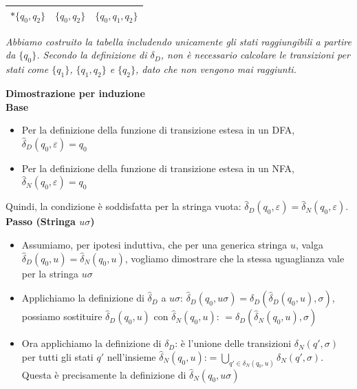 \documentclass[12pt, a4paper]{report}
\begin{document}
\begin{example}{}
\begin{itemize}
\begin{itemize}
\begin{center}
\begin{tabular}{|c|c|c|}
                                $*\{q_0,q_2\}$ & $\{q_0,q_2\}$ & $\{q_0,q_1,q_2\}$\\
                                \hline
                            \end{tabular}
                            \end{center}
                        \end{itemize}
                    \end{itemize}
                    \textit{Abbiamo costruito la tabella includendo unicamente gli stati raggiungibili a partire da $\{q_0\}$. Secondo la definizione di $\delta_D$, non è necessario calcolare le transizioni per stati come $\{q_1\}$, $\{q_1,q_2\}$ e $\{q_2\}$, dato che non vengono mai raggiunti.}
                \end{example}
                \begin{demonstration}
                    \large\textbf{Dimostrazione per induzione}\normalsize\\
                    \textbf{Base}
                    \begin{itemize}
                        \item Per la definizione della funzione di transizione estesa in un DFA, $\hat{\delta}_D({q_0}, \varepsilon) = {q_0}$
                        \item Per la definizione della funzione di transizione estesa in un NFA, $\hat{\delta}_N(q_0, \varepsilon) = {q_0}$
                    \end{itemize}
                    Quindi, la condizione è soddisfatta per la stringa vuota: $\hat{\delta}_D({q_0}, \varepsilon) = \hat{\delta}_N(q_0, \varepsilon)$.\\
                    \textbf{Passo (Stringa $u\sigma$)}
                    \begin{itemize}
                        \item Assumiamo, per ipotesi induttiva, che per una generica stringa $u$, valga $\hat{\delta}_D({q_0}, u) = \hat{\delta}_N(q_0, u)$, vogliamo dimostrare che la stessa uguaglianza vale per la stringa $u\sigma$
                        \item Applichiamo la definizione di $\hat{\delta}_D$ a $u\sigma$: $\hat{\delta}_D({q_0}, u\sigma) = \delta_D(\hat{\delta}_D({q_0}, u), \sigma)$, possiamo sostituire $\hat{\delta}_D({q_0}, u)$ con $\hat{\delta}_N(q_0, u)$: $= \delta_D(\hat{\delta}_N(q_0, u), \sigma)$
                        \item Ora applichiamo la definizione di $\delta_D$: è l'unione delle transizioni $\delta_N(q', \sigma)$ per tutti gli stati $q'$ nell'insieme $\hat{\delta}_N(q_0, u)$:$= \bigcup_{q' \in \hat{\delta}_N(q_0, u)} \delta_N(q', \sigma)$. Questa è precisamente la definizione di $\hat{\delta}_N(q_0, u\sigma)$

\end{itemize}
\end{demonstration}
\end{document}
